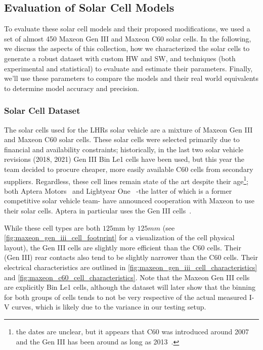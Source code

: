 \subsection{Evaluation of Solar Cell Models}\label{subsec:eval_solar_cell_models}

To evaluate these solar cell models and their proposed modifications, we used a
set of almost 450 Maxeon Gen III and Maxeon C60 solar cells. In the following,
we discuss the aspects of this collection, how we characterized the solar
cells to generate a robust dataset with custom \acf{HW} and \acf{SW}, and
techniques (both experimental and statistical) to evaluate and estimate their
parameters. Finally, we'll use these parameters to compare the models and their
real world equivalents to determine model accuracy and precision.

\subsubsection{Solar Cell Dataset}\label{subsubsec:solar_cell_dataset}

The solar cells used for the \ac{LHRs} solar vehicle are a mixture of Maxeon Gen
III and Maxeon C60 solar cells. These solar cells were selected primarily due to
financial and availability constraints; historically, in the last two solar
vehicle revisions (2018, 2021) Gen III Bin Le1 cells have been used, but this
year the team decided to procure cheaper, more easily available C60 cells from
secondary suppliers. Regardless, these cell lines remain state of the art
despite their age\footnote{the dates are unclear, but it appears that C60 was
introduced around 2007~\cite{sunpower_history} and the Gen III has been around
as long as 2013~\cite{smith_et_al}.}; both Aptera
Motors~\cite{aptera_solar_cells} and Lightyear
One~\cite{lightyear_one_solar_cells} -the latter of which is a former
competitive solar vehicle team- have announced cooperation with Maxeon to use
their solar cells. Aptera in particular uses the Gen III
cells~\cite{aptera_solar_cells}.

While these cell types are both $125 \si{\mm}$ by $125 \si{mm}$ (see
\autoref{fig:maxeon_gen_iii_cell_footprint} for a visualization of the cell
physical layout), the Gen III cells are slightly more efficient than the C60
cells. Their (Gen III) rear contacts also tend to be slightly narrower than the
C60 cells. Their electrical characteristics are outlined in
\autoref{fig:maxeon_gen_iii_cell_characteristics} and
\autoref{fig:maxeon_c60_cell_characteristics}. Note that the Maxeon Gen III
cells are explicitly Bin Le1 cells, although the dataset will later show that
the binning for both groups of cells tends to not be very respective of the
actual measured \ac{I-V} curves, which is likely due to the variance in our
testing setup.

